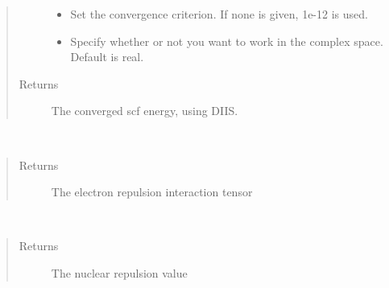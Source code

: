 \documentclass[letterpaper,10pt,english]{sphinxmanual}
\begin{document}
\begin{fulllineitems}
\begin{fulllineitems}
\begin{quote}
\begin{description}
\begin{itemize}
\item {} 
 \textendash{} Set the convergence criterion. If none is given, 1e-12 is used.

\item {} 
 \textendash{} Specify whether or not you want to work in the complex space. Default is real.

\end{itemize}

\item[{Returns}] \leavevmode
The converged scf energy, using DIIS.

\end{description}\end{quote}

\end{fulllineitems}


\begin{fulllineitems}
\label{\detokenize{RHF:hf.HartreeFock.RHF.MF.get_two_e}}~\begin{quote}\begin{description}
\item[{Returns}] \leavevmode
The electron repulsion interaction tensor

\end{description}\end{quote}

\end{fulllineitems}


\begin{fulllineitems}
\label{\detokenize{RHF:hf.HartreeFock.RHF.MF.nuc_rep}}~\begin{quote}\begin{description}
\item[{Returns}] \leavevmode
The nuclear repulsion value

\end{description}\end{quote}

\end{fulllineitems}


\end{fulllineitems}
\end{document}
